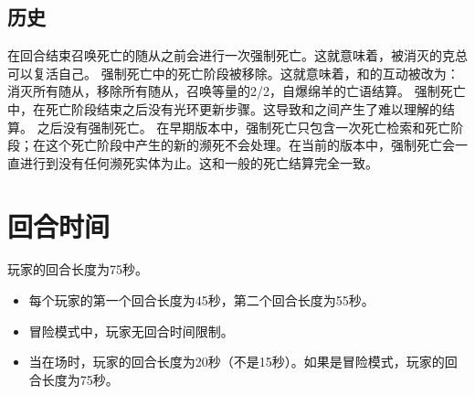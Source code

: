 \subsection{历史}

 在回合结束召唤死亡的随从之前会进行一次强制死亡。这就意味着，被消灭的克总可以复活自己。
 强制死亡中的死亡阶段被移除。这就意味着，和的互动被改为：消灭所有随从，移除所有随从，召唤等量的2/2，自爆绵羊的亡语结算。
 强制死亡中，在死亡阶段结束之后没有光环更新步骤。这导致和之间产生了难以理解的结算。
 之后没有强制死亡。
 在早期版本中，强制死亡只包含一次死亡检索和死亡阶段；在这个死亡阶段中产生的新的濒死不会处理。在当前的版本中，强制死亡会一直进行到没有任何濒死实体为止。这和一般的死亡结算完全一致。

\section{回合时间}

玩家的回合长度为75秒。
\begin{itemize}
    \item 每个玩家的第一个回合长度为45秒，第二个回合长度为55秒。
    \item 冒险模式中，玩家无回合时间限制。
    \item 当在场时，玩家的回合长度为20秒（不是15秒）。如果是冒险模式，玩家的回合长度为75秒。
\end{itemize}